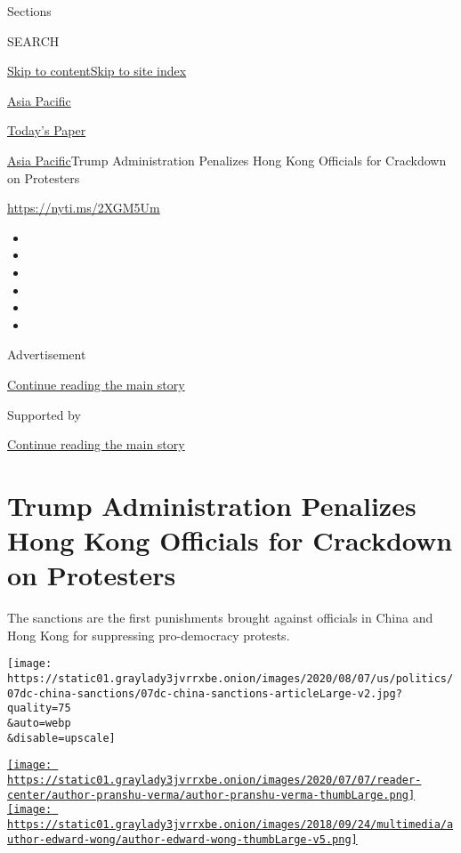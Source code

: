 Sections

SEARCH

\protect\hyperlink{site-content}{Skip to
content}\protect\hyperlink{site-index}{Skip to site index}

\href{https://www.nytimes3xbfgragh.onion/section/world/asia}{Asia
Pacific}

\href{https://myaccount.nytimes3xbfgragh.onion/auth/login?response_type=cookie\&client_id=vi}{}

\href{https://www.nytimes3xbfgragh.onion/section/todayspaper}{Today's
Paper}

\href{/section/world/asia}{Asia Pacific}\textbar{}Trump Administration
Penalizes Hong Kong Officials for Crackdown on Protesters

\url{https://nyti.ms/2XGM5Um}

\begin{itemize}
\item
\item
\item
\item
\item
\item
\end{itemize}

Advertisement

\protect\hyperlink{after-top}{Continue reading the main story}

Supported by

\protect\hyperlink{after-sponsor}{Continue reading the main story}

\hypertarget{trump-administration-penalizes-hong-kong-officials-for-crackdown-on-protesters}{%
\section{Trump Administration Penalizes Hong Kong Officials for
Crackdown on
Protesters}\label{trump-administration-penalizes-hong-kong-officials-for-crackdown-on-protesters}}

The sanctions are the first punishments brought against officials in
China and Hong Kong for suppressing pro-democracy protests.

\texttt{[image: https://static01.graylady3jvrrxbe.onion/images/2020/08/07/us/politics/07dc-china-sanctions/07dc-china-sanctions-articleLarge-v2.jpg?quality=75\\\&auto=webp\\\&disable=upscale]}

\href{https://www.nytimes3xbfgragh.onion/by/pranshu-verma}{\texttt{[image: https://static01.graylady3jvrrxbe.onion/images/2020/07/07/reader-center/author-pranshu-verma/author-pranshu-verma-thumbLarge.png]}}\href{https://www.nytimes3xbfgragh.onion/by/edward-wong}{\texttt{[image: https://static01.graylady3jvrrxbe.onion/images/2018/09/24/multimedia/author-edward-wong/author-edward-wong-thumbLarge-v5.png]}}

